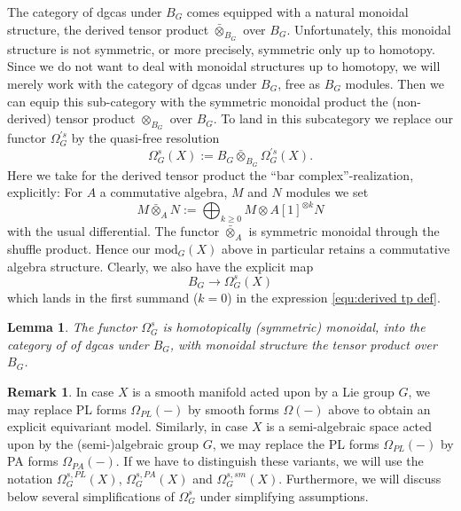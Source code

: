 \documentclass[a4paper]{amsart}
\theoremstyle{plain}
\newtheorem{lemma}[thm]{Lemma}
\theoremstyle{definition}
\newtheorem{rem}[thm]{Remark}
\renewcommand{\mod}{\mathrm{mod}}
\begin{document}
The category of dgcas under $B_G$ comes equipped with a natural monoidal structure, the derived tensor product $\bar\otimes_{B_G}$ over $B_G$.
Unfortunately, this monoidal structure is not symmetric, or more precisely, symmetric only up to homotopy.
Since we do not want to deal with monoidal structures up to homotopy, we will merely work with the category of dgcas under $B_G$, free as $B_G$ modules.
Then we can equip this sub-category with the symmetric monoidal product the (non-derived) tensor product $\otimes_{B_G}$ over $B_G$.
To land in this subcategory we replace our functor $\Omega_G^{'s}$ by the quasi-free resolution
\[
 \Omega_G^{s}(X) := B_G \bar \otimes_{B_G} \Omega_G^{'s}(X).
\]
Here we take for the derived tensor product the ``bar complex''-realization, explicitly:
For $A$ a commutative algebra, $M$ and $N$ modules we set
\begin{equation}\label{equ:derived tp def}
 M\bar \otimes_A N := \bigoplus_{k\geq 0} M\otimes A[1]^{\otimes k} N
\end{equation}
with the usual differential.
The functor $\bar \otimes_A$ is symmetric monoidal through the shuffle product.
Hence our $\mod_G(X)$ above in particular retains a commutative algebra structure.
Clearly, we also have the explicit map 
\[
 B_G \to \Omega_G^{s}(X)
\]
which lands in the first summand ($k=0$) in the expression \eqref{equ:derived tp def}.

\begin{lemma}
The functor $\Omega_G^{s}$ is homotopically (symmetric) monoidal, into the category of of dgcas under $B_G$, with monoidal structure the tensor product over $B_G$.
\end{lemma}

\begin{rem}
In case $X$ is a smooth manifold acted upon by a Lie group $G$, we may replace PL forms $\Omega_{PL}(-)$ by smooth forms $\Omega(-)$ above to obtain an explicit equivariant model.
Similarly, in case $X$ is a semi-algebraic space acted upon by the (semi-)algebraic group $G$, we may replace the PL forms $\Omega_{PL}(-)$ by PA forms $\Omega_{PA}(-)$. 
If we have to distinguish these variants, we will use the notation $\Omega_G^{s,PL}(X)$, $\Omega_G^{s,PA}(X)$ and $\Omega_G^{s,sm}(X)$.
Furthermore, we will discuss below several simplifications of $\Omega_G^{s}$ under simplifying assumptions.
\end{rem}
\end{document}
